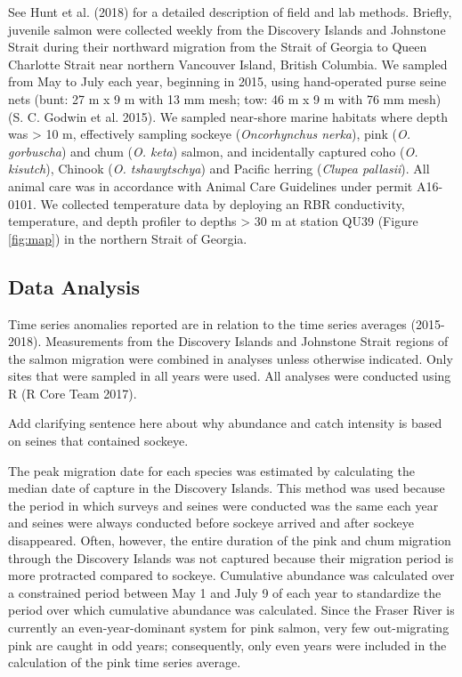 \documentclass[fleqn,10pt]{wlpeerj} %
\begin{document}
See Hunt et al. (2018) for a detailed description of field and lab
methods. Briefly, juvenile salmon were collected weekly from the
Discovery Islands and Johnstone Strait during their northward migration
from the Strait of Georgia to Queen Charlotte Strait near northern
Vancouver Island, British Columbia. We sampled from May to July each
year, beginning in 2015, using hand-operated purse seine nets (bunt: 27
m x 9 m with 13 mm mesh; tow: 46 m x 9 m with 76 mm mesh) (S. C. Godwin
et al. 2015). We sampled near-shore marine habitats where depth was
\textgreater{} 10 m, effectively sampling sockeye (\emph{Oncorhynchus
nerka}), pink (\emph{O. gorbuscha}) and chum (\emph{O. keta}) salmon,
and incidentally captured coho (\emph{O. kisutch}), Chinook (\emph{O.
tshawytschya}) and Pacific herring (\emph{Clupea pallasii}). All animal
care was in accordance with Animal Care Guidelines under permit
A16-0101. We collected temperature data by deploying an RBR
conductivity, temperature, and depth profiler to depths \textgreater{}
30 m at station QU39 (Figure \ref{fig:map}) in the northern Strait of
Georgia.

\subsection{Data Analysis}\label{data-analysis}

Time series anomalies reported are in relation to the time series
averages (2015-2018). Measurements from the Discovery Islands and
Johnstone Strait regions of the salmon migration were combined in
analyses unless otherwise indicated. Only sites that were sampled in all
years were used. All analyses were conducted using R (R Core Team 2017).

Add clarifying sentence here about why abundance and catch intensity is
based on seines that contained sockeye.

The peak migration date for each species was estimated by calculating
the median date of capture in the Discovery Islands. This method was
used because the period in which surveys and seines were conducted was
the same each year and seines were always conducted before sockeye
arrived and after sockeye disappeared. Often, however, the entire
duration of the pink and chum migration through the Discovery Islands
was not captured because their migration period is more protracted
compared to sockeye. Cumulative abundance was calculated over a
constrained period between May 1 and July 9 of each year to standardize
the period over which cumulative abundance was calculated. Since the
Fraser River is currently an even-year-dominant system for pink salmon,
very few out-migrating pink are caught in odd years; consequently, only
even years were included in the calculation of the pink time series
average.
\end{document}
